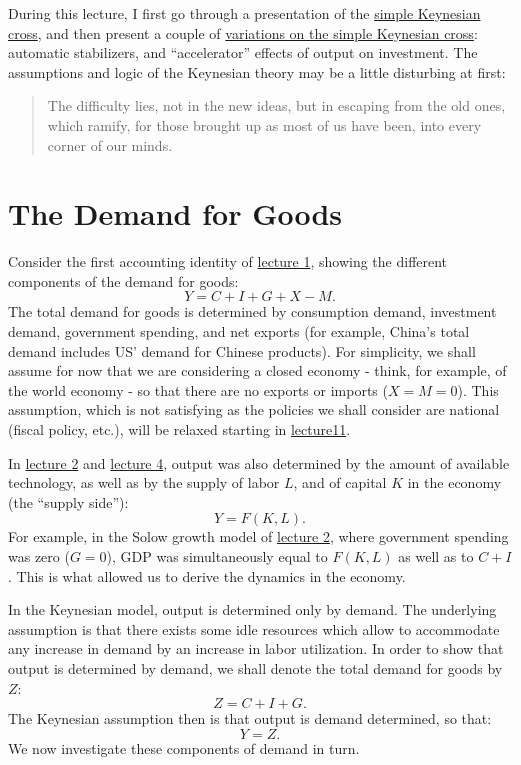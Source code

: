 \documentclass[]{book}
\theoremstyle{definition}
\theoremstyle{definition}
\theoremstyle{definition}
\theoremstyle{remark}
\begin{document}
During this lecture, I first go through a presentation of the
\protect\hyperlink{simple}{simple Keynesian cross}, and then present a
couple of \protect\hyperlink{variations}{variations on the simple
Keynesian cross}: automatic stabilizers, and ``accelerator'' effects of
output on investment. The assumptions and logic of the Keynesian theory
may be a little disturbing at first:

\begin{quote}
The difficulty lies, not in the new ideas, but in escaping from the old
ones, which ramify, for those brought up as most of us have been, into
every corner of our minds.
\end{quote}

\section{The Demand for Goods}\label{the-demand-for-goods}

Consider the first accounting identity of
\protect\hyperlink{intro-cobb}{lecture 1}, showing the different
components of the demand for goods: \[Y=C+I+G+X-M.\] The total demand
for goods is determined by consumption demand, investment demand,
government spending, and net exports (for example, China's total demand
includes US' demand for Chinese products). For simplicity, we shall
assume for now that we are considering a closed economy - think, for
example, of the world economy - so that there are no exports or imports
(\(X=M=0\)). This assumption, which is not satisfying as the policies we
shall consider are national (fiscal policy, etc.), will be relaxed
starting in \protect\hyperlink{open}{lecture11}.

In \protect\hyperlink{solow}{lecture 2} and
\protect\hyperlink{olg}{lecture 4}, output was also determined by the
amount of available technology, as well as by the supply of labor \(L\),
and of capital \(K\) in the economy (the ``supply side''):
\[Y=F\left(K, L\right).\] For example, in the Solow growth model of
\protect\hyperlink{solow}{lecture 2}, where government spending was zero
(\(G=0\)), GDP was simultaneously equal to \(F(K,L)\) as well as to
\(C+I\). This is what allowed us to derive the dynamics in the economy.

In the Keynesian model, output is determined only by demand. The
underlying assumption is that there exists some idle resources which
allow to accommodate any increase in demand by an increase in labor
utilization. In order to show that output is determined by demand, we
shall denote the total demand for goods by \(Z\): \[Z=C+I+G.\] The
Keynesian assumption then is that output is demand determined, so that:
\[Y=Z.\] We now investigate these components of demand in turn.
\end{document}
